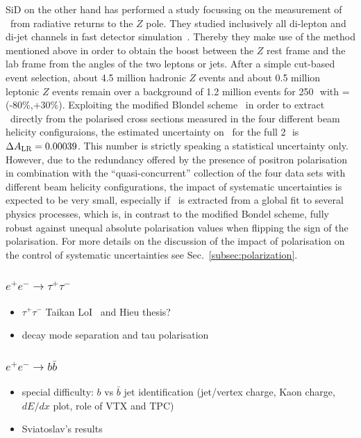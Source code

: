 SiD on the other hand has performed a study focussing on the measurement of \ALR\ from radiative returns to the $Z$ pole. They studied inclusively all di-lepton and di-jet channels in fast detector simulation~\cite{bib:ueno_lcws18}. Thereby they make use of the method mentioned above in order to obtain the boost between the $Z$ rest frame and the lab frame from the angles of the two leptons or jets. After a simple cut-based event selection, about 4.5 million hadronic $Z$ events and about 0.5 million leptonic $Z$ events remain over a background of 1.2 million events for 250\,\ifb\ with \Pmp=(-80\%,+30\%). Exploiting the modified Blondel scheme~\cite{Blondel:1987wr, Monig:2001db} in order to extract \ALR\ directly from the polarised cross sections measured in the four different beam helicity configuraions, the estimated uncertainty on \ALR\ for the full 2\,\iab\ is $\Delta A_{\mathrm{LR}} = 0.00039$. This number is strictly speaking a statistical uncertainty only. However, due to the redundancy offered by the presence of positron polarisation in combination with the ``quasi-concurrent'' collection of the four data sets with different beam helicity configurations, the impact of systematic uncertainties is expected to be very small, especially if \ALR\ is extracted from a global fit to several physics processes, which is, in contrast to the modified Bondel scheme, fully robust against unequal absolute polarisation values when flipping the sign of the polarisation.
For more details on the discussion of the impact of polarisation on the control of systematic uncertainties see Sec.~\ref{subsec:polarization}.

\subsubsection{$e^+e^- \to \tau^+\tau^-$}
\begin{itemize}
\item $\tau^+\tau^-$  Taikan LoI~\cite{Suehara:2009nj} and Hieu thesis?
\item decay mode separation and tau polarisation
\end{itemize}

\subsubsection{$e^+e^- \to b\bar{b}$}
\begin{itemize}
\item special difficulty: $b$ vs $\bar{b}$ jet identification (jet/vertex charge, Kaon charge, $dE/dx$ plot, role of VTX and TPC)
\item Sviatoslav's results
\end{itemize}

